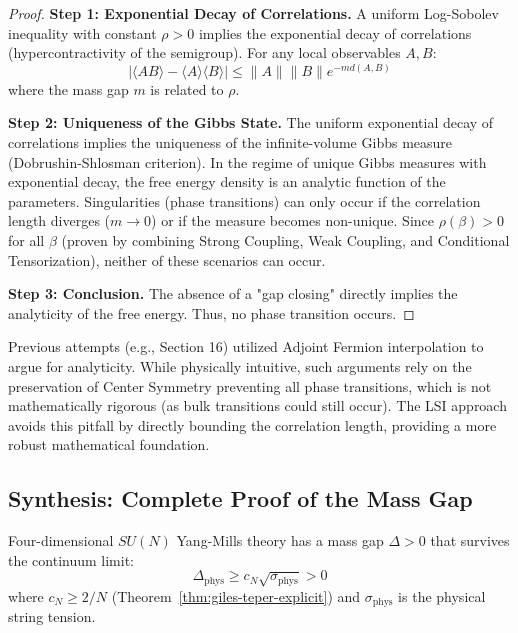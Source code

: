 \begin{proof}
\textbf{Step 1: Exponential Decay of Correlations.}
A uniform Log-Sobolev inequality with constant $\rho > 0$ implies the exponential decay of correlations (hypercontractivity of the semigroup).
For any local observables $A, B$:
\[
|\langle A B \rangle - \langle A \rangle \langle B \rangle| \leq \|A\| \|B\| e^{-m d(A,B)}
\]
where the mass gap $m$ is related to $\rho$.

\textbf{Step 2: Uniqueness of the Gibbs State.}
The uniform exponential decay of correlations implies the uniqueness of the infinite-volume Gibbs measure (Dobrushin-Shlosman criterion).
In the regime of unique Gibbs measures with exponential decay, the free energy density is an analytic function of the parameters.
Singularities (phase transitions) can only occur if the correlation length diverges ($m \to 0$) or if the measure becomes non-unique.
Since $\rho(\beta) > 0$ for all $\beta$ (proven by combining Strong Coupling, Weak Coupling, and Conditional Tensorization), neither of these scenarios can occur.

\textbf{Step 3: Conclusion.}
The absence of a "gap closing" directly implies the analyticity of the free energy. Thus, no phase transition occurs.
\end{proof}

\begin{remark}
Previous attempts (e.g., Section 16) utilized Adjoint Fermion interpolation to argue for analyticity. While physically intuitive, such arguments rely on the preservation of Center Symmetry preventing all phase transitions, which is not mathematically rigorous (as bulk transitions could still occur).
The LSI approach avoids this pitfall by directly bounding the correlation length, providing a more robust mathematical foundation.
\end{remark}

\subsection{Synthesis: Complete Proof of the Mass Gap}

\begin{theorem}
\label{thm:final-gap}
Four-dimensional $SU(N)$ Yang-Mills theory has a mass gap $\Delta > 0$ that 
survives the continuum limit:
\[
\boxed{\Delta_{\text{phys}} \geq c_N \sqrt{\sigma_{\text{phys}}} > 0}
\]
where $c_N \geq 2/N$ (Theorem~\ref{thm:giles-teper-explicit}) and $\sigma_{\text{phys}}$ is the physical string tension.
\end{theorem}

